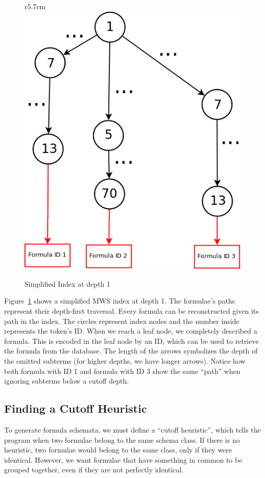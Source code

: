 \documentclass[a4paper,oneside]{article}
\def\MWS{\textsf{MWS}\xspace}
\begin{document}
\begin{figure}r{5.7cm}\vspace*{-1em}
    \includegraphics[scale=0.25]{img/FFG_Algo_diag.png}
\caption{Simplified Index at depth 1}\label{fig:algoindex}
\end{figure}

Figure~\ref{fig:algoindex} shows a simplified \MWS index at depth 1.
The formulae's paths represent their depth-first traversal.
Every formula can be reconstructed given its path in the index.
The circles represent index nodes and the number inside represents
the token's ID. When we reach a leaf node, we completely described a
formula. This is encoded in the leaf node by an ID, which can be used
to retrieve the formula from the database.
The length of the arrows symbolizes the depth of the omitted subterms
(for higher depths, we have longer arrows).
Notice how both formula with ID 1 and formula with ID 3 show the same
``path'' when ignoring subterms below a cutoff depth.

\subsection{Finding a Cutoff Heuristic}\label{subsec:cutoffheur}
To generate formula schemata, we must define a ``cutoff heuristic'',
which tells the program when two formulae belong to the same schema class.
If there is no heuristic, two formulae would belong to the same class,
only if they were identical. However, we want formulae that have something in
common to be grouped together, even if they are not perfectly identical.
\end{document}
